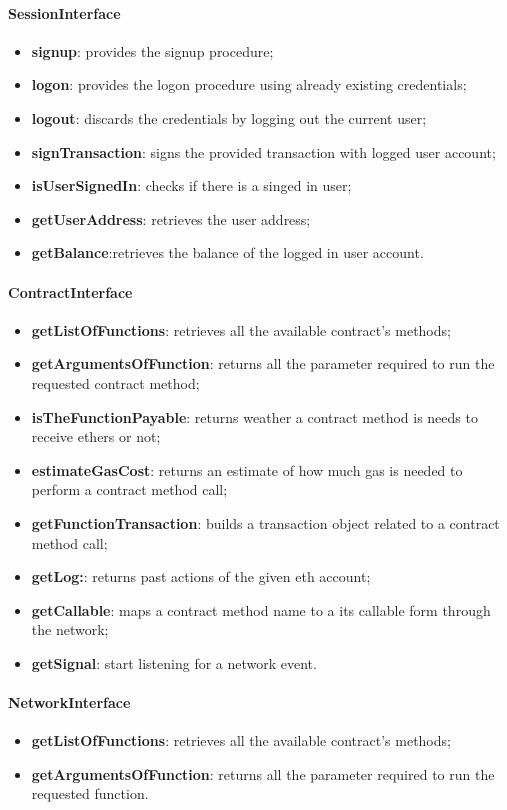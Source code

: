 \paragraph{SessionInterface}
\begin{itemize}
    \item \textbf{signup}: provides the signup procedure;
    \item \textbf{logon}: provides the logon procedure using already existing credentials;
    \item \textbf{logout}: discards the credentials by logging out the current user;
    \item \textbf{signTransaction}: signs the provided transaction with logged user account;
    \item \textbf{isUserSignedIn}: checks if there is a singed in user;
    \item \textbf{getUserAddress}: retrieves the user address;
    \item \textbf{getBalance}:retrieves the balance of the logged in user account.
\end{itemize}
\paragraph{ContractInterface}
\begin{itemize}
    \item \textbf{getListOfFunctions}: retrieves all the available contract's methods;
    \item \textbf{getArgumentsOfFunction}: returns all the parameter required to run the requested contract method;
    \item \textbf{isTheFunctionPayable}: returns weather a contract method is needs to receive ethers or not;
    \item \textbf{estimateGasCost}: returns an estimate of how much gas is needed to perform a contract method call;
    \item \textbf{getFunctionTransaction}: builds a transaction object related to a contract method call;
    \item \textbf{getLog:}: returns past actions of the given eth account; 
    \item \textbf{getCallable}: maps a contract method name to a its callable form through the network;
    \item \textbf{getSignal}: start listening for a network event.
\end{itemize}
\paragraph{NetworkInterface}
\begin{itemize}
    \item \textbf{getListOfFunctions}: retrieves all the available contract's methods;
    \item \textbf{getArgumentsOfFunction}: returns all the parameter required to run the requested function.
\end{itemize}
